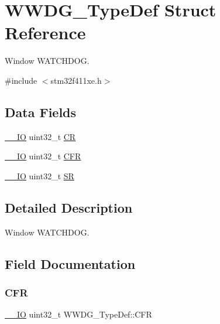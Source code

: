 \hypertarget{struct_w_w_d_g___type_def}{}\section{W\+W\+D\+G\+\_\+\+Type\+Def Struct Reference}
\label{struct_w_w_d_g___type_def}


Window W\+A\+T\+C\+H\+D\+OG.  




{\ttfamily \#include $<$stm32f411xe.\+h$>$}

\subsection*{Data Fields}
\begin{DoxyCompactItemize}
\item 
\hyperlink{core__sc300_8h_aec43007d9998a0a0e01faede4133d6be}{\+\_\+\+\_\+\+IO} uint32\+\_\+t \hyperlink{struct_w_w_d_g___type_def_a4caf530d45f7428c9700d9c0057135f8}{CR}
\item 
\hyperlink{core__sc300_8h_aec43007d9998a0a0e01faede4133d6be}{\+\_\+\+\_\+\+IO} uint32\+\_\+t \hyperlink{struct_w_w_d_g___type_def_adcd6a7e5d75022e46ce60291f4b8544c}{C\+FR}
\item 
\hyperlink{core__sc300_8h_aec43007d9998a0a0e01faede4133d6be}{\+\_\+\+\_\+\+IO} uint32\+\_\+t \hyperlink{struct_w_w_d_g___type_def_a15655cda4854cc794db1f27b3c0bba38}{SR}
\end{DoxyCompactItemize}


\subsection{Detailed Description}
Window W\+A\+T\+C\+H\+D\+OG. 

\subsection{Field Documentation}
\mbox{\label{struct_w_w_d_g___type_def_adcd6a7e5d75022e46ce60291f4b8544c}} 
\subsubsection{\texorpdfstring{C\+FR}{CFR}}
{\footnotesize\ttfamily \hyperlink{core__sc300_8h_aec43007d9998a0a0e01faede4133d6be}{\+\_\+\+\_\+\+IO} uint32\+\_\+t W\+W\+D\+G\+\_\+\+Type\+Def\+::\+C\+FR}

